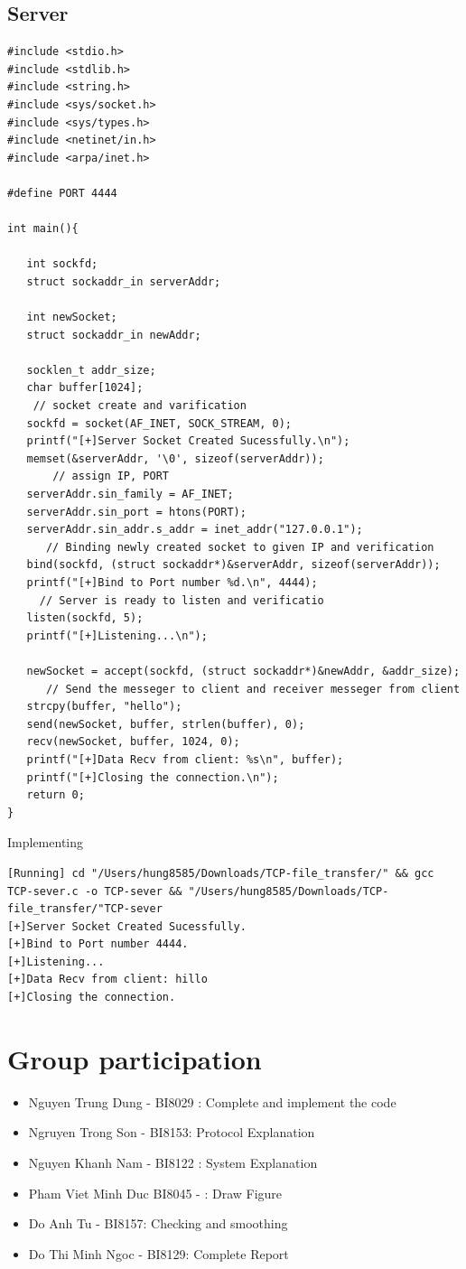 \documentclass{article}
\begin{document}
\subsection{Server}
\begin{lstlisting}
#include <stdio.h>
#include <stdlib.h>
#include <string.h>
#include <sys/socket.h>
#include <sys/types.h>
#include <netinet/in.h>
#include <arpa/inet.h>
 
#define PORT 4444
 
int main(){
 
   int sockfd;
   struct sockaddr_in serverAddr;
 
   int newSocket;
   struct sockaddr_in newAddr;
 
   socklen_t addr_size;
   char buffer[1024];
    // socket create and varification
   sockfd = socket(AF_INET, SOCK_STREAM, 0);
   printf("[+]Server Socket Created Sucessfully.\n");
   memset(&serverAddr, '\0', sizeof(serverAddr));
       // assign IP, PORT
   serverAddr.sin_family = AF_INET;
   serverAddr.sin_port = htons(PORT);
   serverAddr.sin_addr.s_addr = inet_addr("127.0.0.1");
      // Binding newly created socket to given IP and verification
   bind(sockfd, (struct sockaddr*)&serverAddr, sizeof(serverAddr));
   printf("[+]Bind to Port number %d.\n", 4444);
     // Server is ready to listen and verificatio
   listen(sockfd, 5);
   printf("[+]Listening...\n");
 
   newSocket = accept(sockfd, (struct sockaddr*)&newAddr, &addr_size);
      // Send the messeger to client and receiver messeger from client
   strcpy(buffer, "hello");
   send(newSocket, buffer, strlen(buffer), 0);
   recv(newSocket, buffer, 1024, 0);
   printf("[+]Data Recv from client: %s\n", buffer);
   printf("[+]Closing the connection.\n");
   return 0;
}
\end{lstlisting}
\newpage
Implementing
\begin{lstlisting}
[Running] cd "/Users/hung8585/Downloads/TCP-file_transfer/" && gcc TCP-sever.c -o TCP-sever && "/Users/hung8585/Downloads/TCP-file_transfer/"TCP-sever
[+]Server Socket Created Sucessfully.
[+]Bind to Port number 4444.
[+]Listening...
[+]Data Recv from client: hillo
[+]Closing the connection.

\end{lstlisting}
\section{Group participation}
\begin{itemize}
\item Nguyen Trung Dung - BI8029 : Complete and implement the code
\item Ngruyen Trong Son - BI8153: Protocol Explanation
\item Nguyen Khanh Nam - BI8122 : System Explanation
\item Pham Viet Minh Duc BI8045 - : Draw Figure
\item Do Anh Tu - BI8157: Checking and smoothing 
\item Do Thi Minh Ngoc - BI8129: Complete Report
\end{itemize}
\end{document}
